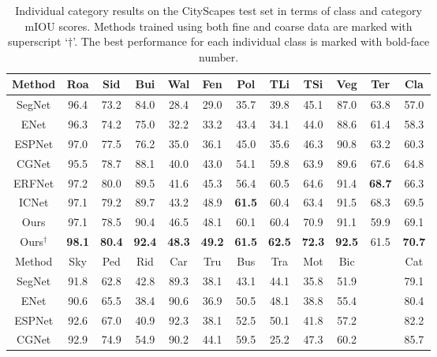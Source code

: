 \documentclass[runningheads]{llncs}
\begin{document}
\begin{table}[!t]
\tabcolsep 1.25mm \caption{Individual category results on the CityScapes test set in terms of class and category mIOU scores. Methods trained using both fine and coarse data are marked with superscript `${\dag}$'. The best performance for each individual class is marked with bold-face number.}
\begin{center}
\begin{tabular}{|c|cccccccccc|c|}
\hline
Method  &{Roa}  &{Sid}  &{Bui}  &{Wal}  &{Fen}  &{Pol}  &{TLi}  &{TSi}  &{Veg}  &{Ter}    &{Cla}\\
\hline
\hline
SegNet \cite{Badrinarayanan2015Segnet} &96.4 &73.2 &84.0 &28.4 &29.0 &35.7 &39.8 &45.1 &87.0 &63.8 &57.0\\
ENet \cite{Paszke2016enet}             &96.3 &74.2 &75.0 &32.2 &33.2 &43.4 &34.1 &44.0 &88.6 &61.4 &58.3\\
ESPNet \cite{Mehta2018espnet}          &97.0 &77.5 &76.2 &35.0 &36.1 &45.0 &35.6 &46.3 &90.8 &63.2 &60.3\\
CGNet \cite{wu2018cgnet}               &95.5 &78.7 &88.1 &40.0 &43.0 &54.1 &59.8 &63.9 &89.6 &67.6 &64.8\\
ERFNet \cite{Romera2018erfnet}         &97.2 &80.0 &89.5 &41.6 &45.3 &56.4 &60.5 &64.6 &91.4 &\textbf{68.7} &66.3\\
ICNet \cite{Zhao2018ICnet}             &97.1 &79.2 &89.7 &43.2 &48.9 &\textbf{61.5} &60.4 &63.4 &91.5 &68.3 &69.5\\
\hline
Ours                                   &97.1 &78.5 &90.4 &46.5 &48.1 &60.1 &60.4 &70.9 &91.1 &59.9 &69.1\\
Ours$^{\dag}$                          &\textbf{98.1} &\textbf{80.4} &\textbf{92.4} &\textbf{48.3} &\textbf{49.2} &\textbf{61.5} &\textbf{62.5} &\textbf{72.3} &\textbf{92.5} &61.5 &\textbf{70.7}\\
\hline
\hline
Method  &{Sky}  &{Ped}  &{Rid}  &{Car}  &{Tru}  &{Bus}  &{Tra}  &{Mot}  &{Bic}  &{~}    &{Cat}\\
\hline
\hline
SegNet \cite{Badrinarayanan2015Segnet} &91.8 &62.8 &42.8 &89.3 &38.1 &43.1 &44.1 &35.8 &51.9 &~ &79.1\\
ENet \cite{Paszke2016enet}             &90.6 &65.5 &38.4 &90.6 &36.9 &50.5 &48.1 &38.8 &55.4 &~ &80.4\\
ESPNet \cite{Mehta2018espnet}          &92.6 &67.0 &40.9 &92.3 &38.1 &52.5 &50.1 &41.8 &57.2 &~ &82.2\\
CGNet \cite{wu2018cgnet}               &92.9 &74.9 &54.9 &90.2 &44.1 &59.5 &25.2 &47.3 &60.2 &~ &85.7\\

\end{tabular}
\end{center}
\end{table}
\end{document}
